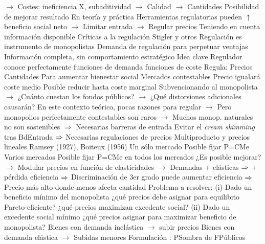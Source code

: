\documentclass{nuevotema}
\begin{document}
\begin{esquemal}
				\4[] $\to$ Costes: ineficiencia X, subaditividad
				\4[] $\to$ Calidad
				\4[] $\to$ Cantidades
			\3 Posibilidad de mejorar resultado
				\4 En teoría y práctica
				\4 Herramientas regulatorias pueden $\uparrow$ beneficio social neto
				\4[] $\to$ Limitar entrada
				\4[] $\to$ Regular precios
				\4[] Teniendo en cuenta información disponible
			\3 Críticas a la regulación
				\4 Stigler y otros
				\4 Regulación es instrumento de monopolistas
				\4[] Demanda de regulación para perpetuar ventajas
		\2 Información completa, sin comportamiento estratégico
			\3 Idea clave
				\4 Regulador conoce perfectamente
				\4[] funciones de demanda
				\4[] funciones de coste
				\4 Regula:
				\4[] Precios
				\4[] Cantidades
				\4[$\to$] Para aumentar bienestar social
			\3 Mercados contestables
				\4 Precio igualará coste medio
				\4[] 
				\4 Posible reducir hasta coste marginal
				\4[] Subvencionando al monopolista
				\4[] $\to$ ¿Cuánto cuestan los fondos públicos?
				\4[] $\to$ ¿Qué distorsiones adicionales causarán?
				\4 En este contexto teórico, pocas razones para regular
				\4[] $\to$ Pero monopolios perfectamente contestables son raros
				\4[] $\to$ Muchos monop. naturales no son sostenibles
				\4[] $\Rightarrow$ Necesarias barreras de entrada
				\4[] Evitar el \textit{cream skimming} tras BdEntrada
				\4[] $\Rightarrow$ Necesarias regulaciones de precios
			\3 Multiproducto y precios lineales
				\4 Ramsey (1927), Boiteux (1956)
				\4 Un sólo mercado
				\4[] Posible fijar P=CMe
				\4 Varios mercados
				\4[] Posible fijar P=CMe en todos los mercados
				\4 ¿Es posible mejorar?
				\4[] $\to$ Modular precios en función de elasticidades
				\4[] $\to$ Demandas + elásticas $\Rightarrow$ + pérdida eficiencia
				\4[] $\Rightarrow$ Discriminación de 3er grado puede aumentar eficiencia
				\4[] $\Rightarrow$ Precio más alto donde menos afecta cantidad
				\4 Problema a resolver:
				\4[] (i) Dado un beneficio mínimo del monopolista
				\4[] ¿qué precios debe asignar para equilibrio Pareto-eficiente?
				\4[] ¿qué precios maximizan excedente social?
				\4[] (ii) Dado un excedente social mínimo
				\4[] ¿qué precios asignar para maximizar beneficio de monopolista?
				\4 Bienes con demanda inelástica
				\4[] $\to$ subir precios
				\4 Bienes con demanda elástica
				\4[] $\to$ Subidas menores
				\4 Formulación
				\4[] 
				\4[] : PSombra de FPúblicos

\end{esquemal}
\end{document}
